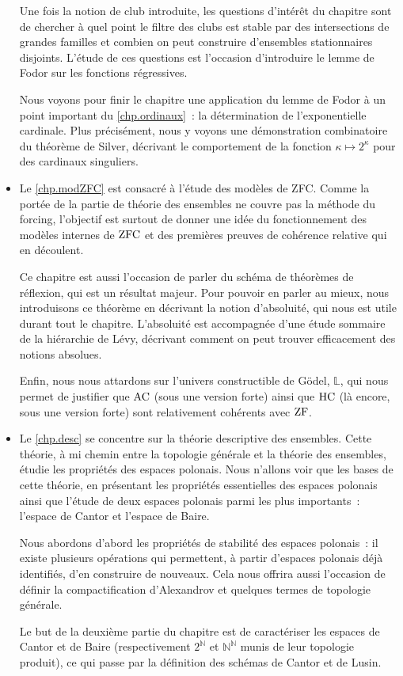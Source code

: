 \begin{itemize}
  Une fois la notion de club introduite, les questions d'intérêt du chapitre
  sont de chercher à quel point le filtre des clubs est stable par des
  intersections de grandes familles et combien on peut construire d'ensembles
  stationnaires disjoints. L'étude de ces questions est l'occasion d'introduire
  le lemme de Fodor sur les fonctions régressives.

  Nous voyons pour finir le chapitre une application du lemme de Fodor à un
  point important du \cref{chp.ordinaux}~: la détermination de l'exponentielle
  cardinale. Plus précisément, nous y voyons une démonstration combinatoire du
  théorème de Silver, décrivant le comportement de la fonction
  $\kappa\mapsto 2^\kappa$ pour des cardinaux singuliers.
\item Le \cref{chp.modZFC} est consacré à l'étude des modèles de ZFC. Comme la
  portée de la partie de théorie des ensembles ne couvre pas la méthode du
  forcing, l'objectif est surtout de donner une idée du fonctionnement des
  modèles internes de $\operatorname{ZFC}$ et des premières preuves de cohérence relative qui
  en découlent.

  Ce chapitre est aussi l'occasion de parler du schéma de théorèmes de
  réflexion, qui est un résultat majeur. Pour pouvoir en parler au mieux, nous
  introduisons ce théorème en décrivant la notion d'absoluité, qui nous est
  utile durant tout le chapitre. L'absoluité est accompagnée d'une étude
  sommaire de la hiérarchie de Lévy, décrivant comment on peut trouver
  efficacement des notions absolues.

  Enfin, nous nous attardons sur l'univers constructible de Gödel, $\mathbb L$,
  qui nous permet de justifier que $\operatorname{AC}$ (sous une version forte) ainsi que $\operatorname{HC}$
  (là encore, sous une version forte) sont relativement cohérents avec $\operatorname{ZF}$.
\item Le \cref{chp.desc} se concentre sur la théorie descriptive des ensembles.
  Cette théorie, à mi chemin entre la topologie générale et la théorie des
  ensembles, étudie les propriétés des espaces polonais. Nous n'allons voir que
  les bases de cette théorie, en présentant les propriétés essentielles des
  espaces polonais ainsi que l'étude de deux espaces polonais parmi les plus
  importants~: l'espace de Cantor et l'espace de Baire.

  Nous abordons d'abord les propriétés de stabilité des espaces polonais~: il
  existe plusieurs opérations qui permettent, à partir d'espaces polonais déjà
  identifiés, d'en construire de nouveaux. Cela nous offrira aussi l'occasion
  de définir la compactification d'Alexandrov et quelques termes de topologie
  générale.

  Le but de la deuxième partie du chapitre est de caractériser les espaces de
  Cantor et de Baire (respectivement $2^\mathbb N$ et $\mathbb N^\mathbb N$
  munis de leur topologie produit), ce qui passe par la définition des schémas
  de Cantor et de Lusin.
\end{itemize}


